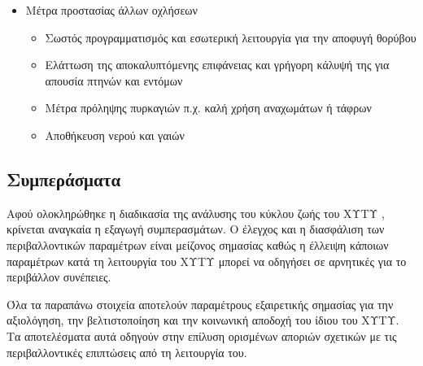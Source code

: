 \documentclass[12pt]{article}
\begin{document}
\begin{itemize}
\begin{itemize}
 		\end{itemize}
 		\item Μέτρα προστασίας άλλων οχλήσεων
 		\begin{itemize}
 			\item Σωστός προγραμματισμός και εσωτερική λειτουργία για την αποφυγή θορύβου 
 			\item Ελάττωση της αποκαλυπτόμενης επιφάνειας και  γρήγορη κάλυψή της για απουσία πτηνών και εντόμων
 			\item Μέτρα πρόληψης πυρκαγιών π.χ. καλή χρήση αναχωμάτων ή τάφρων
 			\item Αποθήκευση νερού και γαιών
 		\end{itemize}
 	\end{itemize}
 
 	\subsection{Συμπεράσματα}
 	
 	Αφού ολοκληρώθηκε η διαδικασία της ανάλυσης του κύκλου ζωής του ΧΥΤΥ , κρίνεται αναγκαία η εξαγωγή συμπερασμάτων. Ο έλεγχος και η διασφάλιση των περιβαλλοντικών παραμέτρων είναι μείζονος σημασίας καθώς η έλλειψη κάποιων παραμέτρων κατά τη λειτουργία του ΧΥΤΥ μπορεί να οδηγήσει σε αρνητικές για το περιβάλλον συνέπειες.
 	
 	Όλα τα παραπάνω στοιχεία αποτελούν παραμέτρους εξαιρετικής σημασίας για την αξιολόγηση, την βελτιστοποίηση και την κοινωνική αποδοχή του ίδιου του ΧΥΤΥ. Τα αποτελέσματα αυτά οδηγούν στην επίλυση ορισμένων αποριών σχετικών με τις περιβαλλοντικές επιπτώσεις από τη λειτουργία του.
 	
\end{document}

